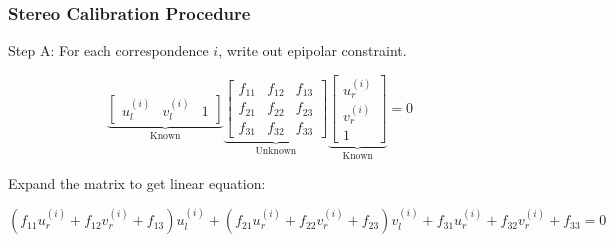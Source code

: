 \begin{frame}
    \frametitle{Stereo Calibration Procedure}
    
    Step A: For each correspondence $i$, write out epipolar constraint.

    \begin{equation*}
    \underbrace{\begin{bmatrix} u_l^{(i)} & v_l^{(i)} & 1 \end{bmatrix}}_{\text{Known}}
    \underbrace{\begin{bmatrix} f_{11} & f_{12} & f_{13} \\ f_{21} & f_{22} & f_{23} \\ f_{31} & f_{32} & f_{33} \end{bmatrix}}_{\text{Unknown}}
    \underbrace{\begin{bmatrix} u_r^{(i)} \\ v_r^{(i)} \\ 1 \end{bmatrix}}_{\text{Known}}
    = 0
    \end{equation*}

    Expand the matrix to get linear equation:

    \begin{equation*}
    (f_{11}u_r^{(i)} + f_{12}v_r^{(i)} + f_{13})u_l^{(i)} + (f_{21}u_r^{(i)} + f_{22}v_r^{(i)} + f_{23})v_l^{(i)} + f_{31}u_r^{(i)} + f_{32}v_r^{(i)} + f_{33} = 0
    \end{equation*}
    
\end{frame}

